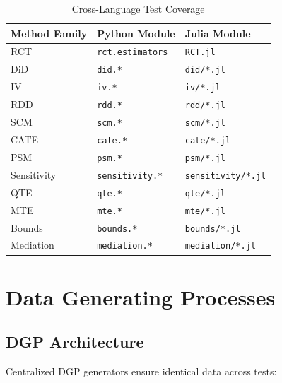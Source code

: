 \begin{table}[h]
\centering
\caption{Cross-Language Test Coverage}
\begin{tabular}{lll}
\toprule
Method Family & Python Module & Julia Module \\
\midrule
RCT & \texttt{rct.estimators} & \texttt{RCT.jl} \\
DiD & \texttt{did.*} & \texttt{did/*.jl} \\
IV & \texttt{iv.*} & \texttt{iv/*.jl} \\
RDD & \texttt{rdd.*} & \texttt{rdd/*.jl} \\
SCM & \texttt{scm.*} & \texttt{scm/*.jl} \\
CATE & \texttt{cate.*} & \texttt{cate/*.jl} \\
PSM & \texttt{psm.*} & \texttt{psm/*.jl} \\
Sensitivity & \texttt{sensitivity.*} & \texttt{sensitivity/*.jl} \\
QTE & \texttt{qte.*} & \texttt{qte/*.jl} \\
MTE & \texttt{mte.*} & \texttt{mte/*.jl} \\
Bounds & \texttt{bounds.*} & \texttt{bounds/*.jl} \\
Mediation & \texttt{mediation.*} & \texttt{mediation/*.jl} \\
\bottomrule
\end{tabular}
\end{table}


\section{Data Generating Processes}

\subsection{DGP Architecture}

Centralized DGP generators ensure identical data across tests:

